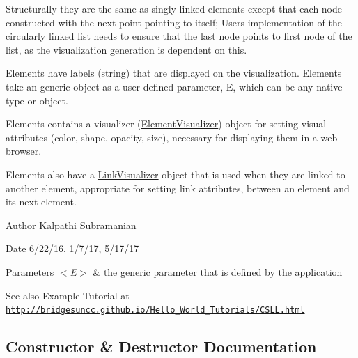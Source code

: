 Structurally they are the same as singly linked elements except that each node constructed with the next point pointing to itself; User\textquotesingle{}s implementation of the circularly linked list needs to ensure that the last node points to first node of the list, as the visualization generation is dependent on this.

Elements have labels (string) that are displayed on the visualization. Elements take an generic object as a user defined parameter, E, which can be any native type or object.

Elements contains a visualizer (\hyperlink{classbridges_1_1base_1_1_element_visualizer}{Element\+Visualizer}) object for setting visual attributes (color, shape, opacity, size), necessary for displaying them in a web browser.

Elements also have a \hyperlink{classbridges_1_1base_1_1_link_visualizer}{Link\+Visualizer} object that is used when they are linked to another element, appropriate for setting link attributes, between an element and its next element.

\begin{DoxyAuthor}{Author}
Kalpathi Subramanian
\end{DoxyAuthor}
\begin{DoxyDate}{Date}
6/22/16, 1/7/17, 5/17/17
\end{DoxyDate}

\begin{DoxyParams}{Parameters}
{\em $<$\+E$>$} & the generic parameter that is defined by the application\\
\hline
\end{DoxyParams}
\begin{DoxySeeAlso}{See also}
Example Tutorial at ~\newline
 \href{http://bridgesuncc.github.io/Hello_World_Tutorials/CSLL.html}{\tt http\+://bridgesuncc.\+github.\+io/\+Hello\+\_\+\+World\+\_\+\+Tutorials/\+C\+S\+L\+L.\+html} 
\end{DoxySeeAlso}


\subsection{Constructor \& Destructor Documentation}
\hypertarget{classbridges_1_1base_1_1_circ_s_lelement_a4a5a58cc7a0ec5170a828861c11df1b3}{}\label{classbridges_1_1base_1_1_circ_s_lelement_a4a5a58cc7a0ec5170a828861c11df1b3} 
